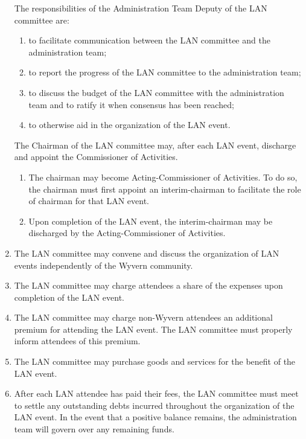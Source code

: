 \begin{enumerate}
    \begin{item}
        The responsibilities of the Administration Team Deputy of the LAN committee are:
        \begin{enumerate}
            \item to facilitate communication between the LAN committee and the administration team;
            \item to report the progress of the LAN committee to the administration team;
            \item to discuss the budget of the LAN committee with the administration team and to ratify it when consensus has been reached;
            \item to otherwise aid in the organization of the LAN event.
        \end{enumerate}
    \end{item}
    
    \begin{item}
        The Chairman of the LAN committee may, after each LAN event, discharge and appoint the Commissioner of Activities.
        \begin{enumerate}
            \item The chairman may become Acting-Commissioner of Activities. To do so, the chairman must first appoint an interim-chairman to facilitate the role of chairman for that LAN event.
            \item Upon completion of the LAN event, the interim-chairman may be discharged by the Acting-Commissioner of Activities.
        \end{enumerate}
    \end{item}

    \item The LAN committee may convene and discuss the organization of LAN events independently of the Wyvern community.
    
    \item The LAN committee may charge attendees a share of the expenses upon completion of the LAN event.
    
    \item The LAN committee may charge non-Wyvern attendees an additional premium for attending the LAN event. The LAN committee must properly inform attendees of this premium.
    
    \item The LAN committee may purchase goods and services for the benefit of the LAN event.
    
    \item After each LAN attendee has paid their fees, the LAN committee must meet to settle any outstanding debts incurred throughout the organization of the LAN event. In the event that a positive balance remains, the administration team will govern over any remaining funds.
    

\end{enumerate}
